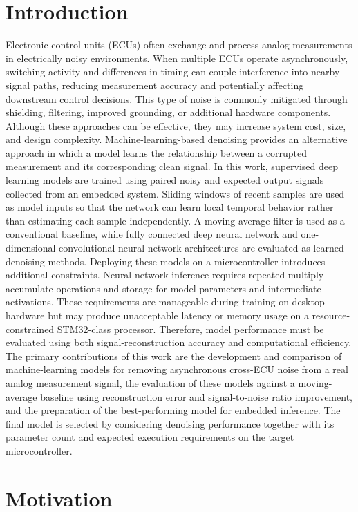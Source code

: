 \documentclass[conference]{IEEEtran}
\begin{document}
\section{Introduction} Electronic control units (ECUs) often exchange and process analog measurements in electrically noisy environments. When multiple ECUs operate asynchronously, switching activity and differences in timing can couple interference into nearby signal paths, reducing measurement accuracy and potentially affecting downstream control decisions. This type of noise is commonly mitigated through shielding, filtering, improved grounding, or additional hardware components. Although these approaches can be effective, they may increase system cost, size, and design complexity. Machine-learning-based denoising provides an alternative approach in which a model learns the relationship between a corrupted measurement and its corresponding clean signal. In this work, supervised deep learning models are trained using paired noisy and expected output signals collected from an embedded system. Sliding windows of recent samples are used as model inputs so that the network can learn local temporal behavior rather than estimating each sample independently. A moving-average filter is used as a conventional baseline, while fully connected deep neural network and one-dimensional convolutional neural network architectures are evaluated as learned denoising methods. Deploying these models on a microcontroller introduces additional constraints. Neural-network inference requires repeated multiply-accumulate operations and storage for model parameters and intermediate activations. These requirements are manageable during training on desktop hardware but may produce unacceptable latency or memory usage on a resource-constrained STM32-class processor. Therefore, model performance must be evaluated using both signal-reconstruction accuracy and computational efficiency. The primary contributions of this work are the development and comparison of machine-learning models for removing asynchronous cross-ECU noise from a real analog measurement signal, the evaluation of these models against a moving-average baseline using reconstruction error and signal-to-noise ratio improvement, and the preparation of the best-performing model for embedded inference. The final model is selected by considering denoising performance together with its parameter count and expected execution requirements on the target microcontroller. 

\section{Motivation}
\end{document}

